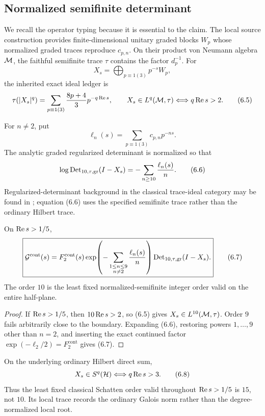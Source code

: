 \subsection{Normalized semifinite determinant}

We recall the operator typing because it is essential to the claim.  The
local source construction provides finite-dimensional unitary graded blocks
\(W_p\) whose normalized graded traces reproduce \(c_{p,n}\).  On their
product von Neumann algebra \(\mathcal M\), the faithful semifinite trace \(\tau\)
contains the factor \(d_p^{-1}\).  For
\[
 X_s=\bigoplus_{p\equiv1(3)}p^{-s}W_p,
\]
the inherited exact ideal ledger is
\[
 \tau(|X_s|^q)
 =\sum_{p\equiv1(3)}\frac{8p+4}{3}p^{-q\operatorname{Re} s},
 \qquad
 X_s\in L^q(\mathcal M,\tau)
 \Longleftrightarrow q\operatorname{Re} s>2.                     \tag{6.5}
\]

For \(n\ne2\), put
\[
 \ell_n(s)=\sum_{p\equiv1(3)}c_{p,n}p^{-ns}.
\]
The analytic graded regularized determinant is normalized so that
\[
 \log\operatorname{Det}_{10,\tau,\mathrm{gr}}(I-X_s)
 =-\sum_{n\ge10}\frac{\ell_n(s)}n.                     \tag{6.6}
\]
Regularized-determinant background in the classical trace-ideal category
may be found in \cite[Chapter~9]{Simon2005}; equation (6.6) uses the
specified semifinite trace rather than the ordinary Hilbert trace.

\begin{theorem}\label{thm:det10}
On \(\operatorname{Re} s>1/5\),
\[
\boxed{
 \mathcal G^{\mathrm{cont}}(s)
 =F_2^{\mathrm{cont}}(s)
  \exp\!\left(
  -\sum_{\substack{1\le n\le9\\n\ne2}}
  \frac{\ell_n(s)}n
  \right)
  \operatorname{Det}_{10,\tau,\mathrm{gr}}(I-X_s).}                  \tag{6.7}
\]
The order \(10\) is the least fixed normalized-semifinite integer order
valid on the entire half-plane.
\end{theorem}

\begin{proof}
If \(\operatorname{Re} s>1/5\), then \(10\operatorname{Re} s>2\), so (6.5) gives
\(X_s\in L^{10}(\mathcal M,\tau)\).  Order \(9\) fails arbitrarily close to the
boundary.  Expanding (6.6), restoring powers \(1,\dots,9\) other than
\(n=2\), and inserting the exact continued factor
\(\exp(-\ell_2/2)=F_2^{\mathrm{cont}}\) gives (6.7).
\end{proof}

\begin{proposition}\label{prop:classical}
On the underlying ordinary Hilbert direct sum,
\[
 X_s\in S^q(\mathcal H)\Longleftrightarrow q\operatorname{Re} s>3.       \tag{6.8}
\]
Thus the least fixed classical Schatten order valid throughout
\(\operatorname{Re} s>1/5\) is \(15\), not \(10\).  Its local trace records the
ordinary Galois norm rather than the degree-normalized local root.
\end{proposition}

